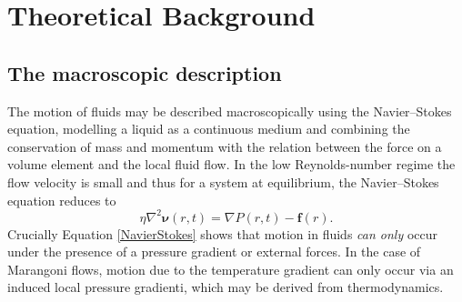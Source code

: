 \section{Theoretical Background}
\subsection{The macroscopic description}\label{Macroscopic}
The motion of fluids may be described macroscopically using the  Navier--Stokes equation,\cite{simpleLiquids} modelling a liquid as a continuous medium and combining the conservation of mass and momentum with the relation between the force on a volume element and the local fluid flow.
In the low Reynolds-number regime the flow velocity is small and thus for a system at equilibrium, the Navier--Stokes equation reduces to
\begin{equation}
\label{NavierStokes}
\eta \nabla^{2}\mathbf{\nu}(r,t) = \nabla P(r,t) - \mathbf{f}(r).
\end{equation}
Crucially Equation \ref{NavierStokes} shows that motion in fluids \textit{can only} occur under the presence of a pressure gradient or external forces.
In the case of Marangoni flows, motion due to the temperature gradient can only occur via an induced local pressure gradienti, which may be derived from thermodynamics.

